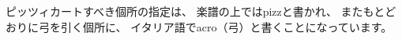 \documentclass{jsarticle}
\begin{document}
ピッツィカートすべき個所の指定は、
楽譜の上ではpizzと書かれ、
またもとどおりに弓を引く個所に、
イタリア語でacro（弓）と書くことになっています。
\printindex
\end{document}

